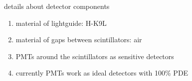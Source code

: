 \documentclass[11pt,compress,xcolor=x11names,UTF8]{beamer}
\begin{document}
\begin{frame}{ details about detector components}
	\begin{enumerate}
		\item material of lightguide:  H-K9L
		\item  material of gaps between scintillators: air
		\item  PMTs around the scintillators as sensitive detectors
		\item currently PMTs work as ideal detectors with 100\% PDE
	\end{enumerate}


\end{frame}

%
%
\end{document}
